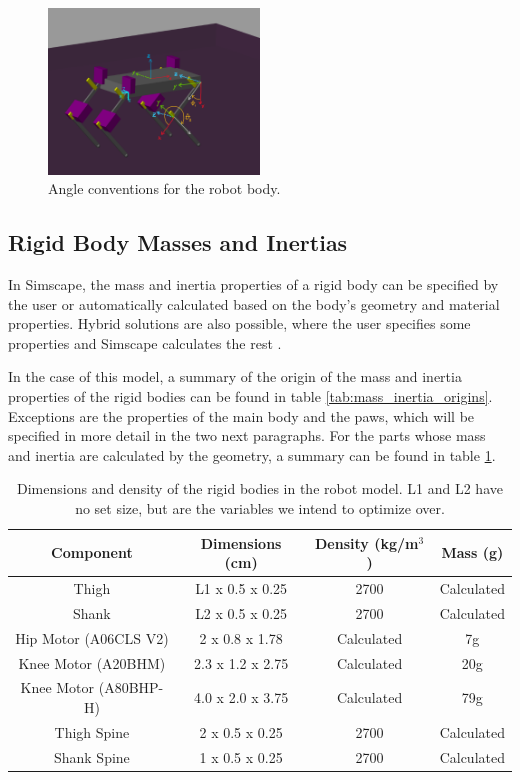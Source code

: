 \begin{figure}
    \centering
    \includegraphics[width=0.5\textwidth]{Images/angle_conventions.png}
    \caption{Angle conventions for the robot body.}
    \label{fig:angle_conventions}
\end{figure}

\subsection{Rigid Body Masses and Inertias}
\label{sec:mass_inertia_properties}

In Simscape, the mass and inertia properties of a rigid body can be specified by the user or automatically calculated based on the body's geometry and material properties. Hybrid solutions are also possible, where the user specifies some properties and Simscape calculates the rest \cite{simscape_tutorial}. 

In the case of this model, a summary of the origin of the mass and inertia properties of the rigid bodies can be found in table \ref{tab:mass_inertia_origins}. Exceptions are the properties of the main body and the paws, which will be specified in more detail in the two next paragraphs. For the parts whose mass and inertia are calculated by the geometry, a summary can be found in table \ref{tab:mass_geometry_properties}. 

\begin{table}
\centering
\begin{tabular}{|c|c|c|c|}
\hline
\textbf{Component} & \textbf{Dimensions (cm)} & \textbf{Density (kg/m$^3$)} & \textbf{Mass (g)}\\
\hline
Thigh & L1 x 0.5 x 0.25 & 2700 & Calculated \\
Shank & L2 x 0.5 x 0.25 & 2700 & Calculated \\
Hip Motor (A06CLS V2) & 2 x 0.8 x 1.78 & Calculated &  7g \\
Knee Motor (A20BHM) & 2.3 x 1.2 x 2.75 & Calculated & 20g \\
Knee Motor (A80BHP-H) & 4.0 x 2.0 x 3.75 & Calculated & 79g \\
Thigh Spine & 2 x 0.5 x 0.25 & 2700 & Calculated \\
Shank Spine & 1 x 0.5 x 0.25 & 2700 & Calculated \\
\hline
\end{tabular}
\caption{Dimensions and density of the rigid bodies in the robot model. L1 and L2 have no set size, but are the variables we intend to optimize over. }
\label{tab:mass_geometry_properties}
\end{table}

